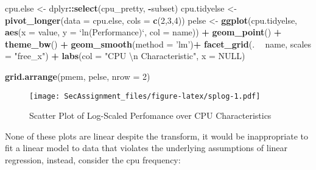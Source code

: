 \documentclass[12pt]{article}
\newenvironment{Shaded}{\begin{snugshade}}{\end{snugshade}}
\newcommand{\CharTok}[1]{\textcolor[rgb]{0.31,0.60,0.02}{#1}}
\newcommand{\DataTypeTok}[1]{\textcolor[rgb]{0.13,0.29,0.53}{#1}}
\newcommand{\DecValTok}[1]{\textcolor[rgb]{0.00,0.00,0.81}{#1}}
\newcommand{\KeywordTok}[1]{\textcolor[rgb]{0.13,0.29,0.53}{\textbf{#1}}}
\newcommand{\NormalTok}[1]{#1}
\newcommand{\OperatorTok}[1]{\textcolor[rgb]{0.81,0.36,0.00}{\textbf{#1}}}
\newcommand{\OtherTok}[1]{\textcolor[rgb]{0.56,0.35,0.01}{#1}}
\newcommand{\StringTok}[1]{\textcolor[rgb]{0.31,0.60,0.02}{#1}}
\begin{document}
\begin{Shaded}
\begin{Highlighting}[]
\NormalTok{cpu.else <-}\StringTok{ }\NormalTok{dplyr}\OperatorTok{::}\KeywordTok{select}\NormalTok{(cpu_pretty, }\OperatorTok{-}\NormalTok{subset)}
\NormalTok{cpu.tidyelse <-}\StringTok{ }\KeywordTok{pivot_longer}\NormalTok{(}\DataTypeTok{data =}\NormalTok{ cpu.else, }\DataTypeTok{cols =} \KeywordTok{c}\NormalTok{(}\DecValTok{2}\NormalTok{,}\DecValTok{3}\NormalTok{,}\DecValTok{4}\NormalTok{))}
\NormalTok{pelse <-}\StringTok{ }\KeywordTok{ggplot}\NormalTok{(cpu.tidyelse, }\KeywordTok{aes}\NormalTok{(}\DataTypeTok{x =}\NormalTok{ value, }\DataTypeTok{y =} \StringTok{`}\DataTypeTok{ln(Performance)}\StringTok{`}\NormalTok{, }\DataTypeTok{col =}\NormalTok{ name)) }\OperatorTok{+}
\StringTok{  }\KeywordTok{geom_point}\NormalTok{() }\OperatorTok{+}\StringTok{ }
\StringTok{  }\KeywordTok{theme_bw}\NormalTok{() }\OperatorTok{+}
\StringTok{  }\KeywordTok{geom_smooth}\NormalTok{(}\DataTypeTok{method =} \StringTok{'lm'}\NormalTok{)}\OperatorTok{+}
\StringTok{  }\KeywordTok{facet_grid}\NormalTok{(. }\OperatorTok{~}\StringTok{ }\NormalTok{name, }\DataTypeTok{scales =} \StringTok{"free_x"}\NormalTok{) }\OperatorTok{+}\StringTok{ }
\StringTok{  }\KeywordTok{labs}\NormalTok{(}\DataTypeTok{col =} \StringTok{"CPU }\CharTok{\textbackslash{}n}\StringTok{ Characteristic"}\NormalTok{, }\DataTypeTok{x =} \OtherTok{NULL}\NormalTok{)}

\KeywordTok{grid.arrange}\NormalTok{(pmem, pelse, }\DataTypeTok{nrow =} \DecValTok{2}\NormalTok{)}
\end{Highlighting}
\end{Shaded}

\begin{figure}
\centering
\texttt{[image: SecAssignment\_files/figure-latex/splog-1.pdf]}
\caption{Scatter Plot of Log-Scaled Perfomance over CPU Characteristics}
\end{figure}

None of these plots are linear despite the transform, it would be
inappropriate to fit a linear model to data that violates the underlying
assumptions of linear regression, instead, consider the cpu frequency:
\end{document}
